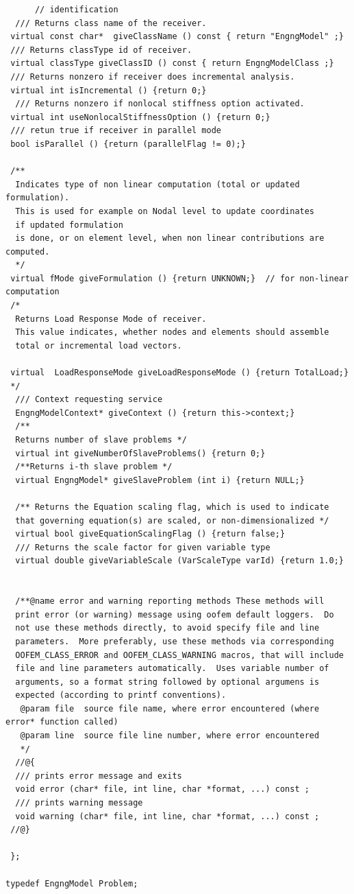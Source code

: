 \documentclass[a4paper]{article}
\begin{document}
{\begin{verbatim}
      // identification 
  /// Returns class name of the receiver.
 virtual const char*  giveClassName () const { return "EngngModel" ;}
 /// Returns classType id of receiver.
 virtual classType giveClassID () const { return EngngModelClass ;}
 /// Returns nonzero if receiver does incremental analysis.
 virtual int isIncremental () {return 0;}
  /// Returns nonzero if nonlocal stiffness option activated.
 virtual int useNonlocalStiffnessOption () {return 0;}
 /// retun true if receiver in parallel mode
 bool isParallel () {return (parallelFlag != 0);}

 /**
  Indicates type of non linear computation (total or updated formulation).
  This is used for example on Nodal level to update coordinates 
  if updated formulation 
  is done, or on element level, when non linear contributions are computed.
  */
 virtual fMode giveFormulation () {return UNKNOWN;}  // for non-linear computation
 /*
  Returns Load Response Mode of receiver.
  This value indicates, whether nodes and elements should assemble
  total or incremental load vectors.
  
 virtual  LoadResponseMode giveLoadResponseMode () {return TotalLoad;}
 */
  /// Context requesting service
  EngngModelContext* giveContext () {return this->context;}
  /**
  Returns number of slave problems */
  virtual int giveNumberOfSlaveProblems() {return 0;}
  /**Returns i-th slave problem */
  virtual EngngModel* giveSlaveProblem (int i) {return NULL;}

  /** Returns the Equation scaling flag, which is used to indicate
  that governing equation(s) are scaled, or non-dimensionalized */
  virtual bool giveEquationScalingFlag () {return false;}
  /// Returns the scale factor for given variable type
  virtual double giveVariableScale (VarScaleType varId) {return 1.0;}


  /**@name error and warning reporting methods These methods will
  print error (or warning) message using oofem default loggers.  Do
  not use these methods directly, to avoid specify file and line
  parameters.  More preferably, use these methods via corresponding
  OOFEM_CLASS_ERROR and OOFEM_CLASS_WARNING macros, that will include
  file and line parameters automatically.  Uses variable number of
  arguments, so a format string followed by optional argumens is
  expected (according to printf conventions).
   @param file  source file name, where error encountered (where error* function called)
   @param line  source file line number, where error encountered
   */
  //@{
  /// prints error message and exits
  void error (char* file, int line, char *format, ...) const ;
  /// prints warning message
  void warning (char* file, int line, char *format, ...) const ;
 //@}

 };

typedef EngngModel Problem;



\end{verbatim}}
\end{document}
